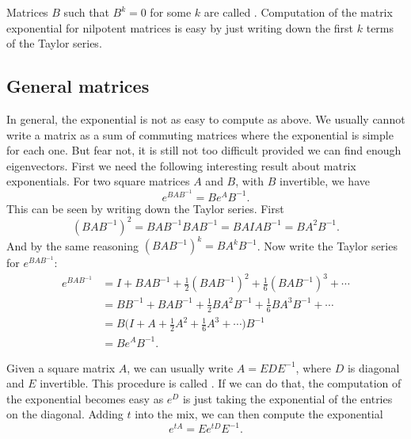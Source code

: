 Matrices $B$ such that $B^k = 0$ for some $k$ are called
\emph{}.  Computation of the matrix exponential for
nilpotent matrices is easy by just writing down the first $k$ terms of
the Taylor series.

\subsection{General matrices}

In general, the exponential is not as easy to compute as above.  We usually
cannot write a matrix as a sum of commuting matrices where the exponential
is simple for each one.  But fear not, it is still not too difficult provided
we can find enough eigenvectors.  First we need the following interesting
result about matrix exponentials.  For two square matrices $A$ and $B$, with
$B$ invertible,
we have
\begin{equation*}
e^{BAB^{-1}} = B e^A B^{-1} .
\end{equation*}
This can be seen by writing down the Taylor series.  First 
\begin{equation*}
{(BAB^{-1})}^2 =
BAB^{-1} BAB^{-1} =
BAIAB^{-1} =
BA^2B^{-1} .
\end{equation*}
And by the same reasoning ${(BAB^{-1})}^k = B A^k B^{-1}$.  Now write 
the Taylor series for
$e^{BAB^{-1}}$:
\begin{equation*}
\begin{split}
e^{BAB^{-1}} & =
I + {BAB^{-1}} + \frac{1}{2} {(BAB^{-1})}^2 + 
\frac{1}{6} {(BAB^{-1})}^3 + \cdots
\\
& =
BB^{-1} + {BAB^{-1}} + \frac{1}{2} BA^2B^{-1} + 
\frac{1}{6} BA^3B^{-1} + \cdots
\\
& =
B \bigl(
I + A + \frac{1}{2} A^2 + 
\frac{1}{6} A^3 + \cdots \bigr) B^{-1} \\
& = B e^A B^{-1} .
\end{split}
\end{equation*}

Given a square matrix $A$, 
we can usually write $A = E D E^{-1}$, where $D$ is
diagonal and $E$ invertible.
This procedure is called \emph{}.
If we can do
that, the computation  of the
exponential becomes easy as $e^D$ is just taking the exponential of
the entries on the diagonal.  Adding $t$ into the mix, 
we can then compute the exponential
\begin{equation*}
e^{tA} = E e^{tD} E^{-1} .
\end{equation*}

